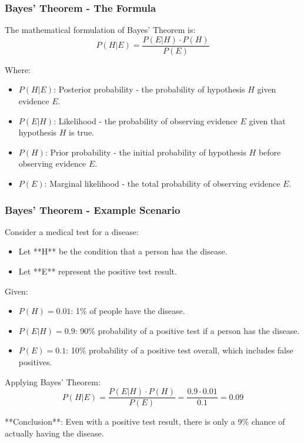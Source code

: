 \documentclass[aspectratio=169]{beamer}
\begin{document}
\begin{frame}[fragile]
    \frametitle{Bayes' Theorem - The Formula}
    The mathematical formulation of Bayes' Theorem is:
    \begin{equation}
    P(H|E) = \frac{P(E|H) \cdot P(H)}{P(E)}
    \end{equation}
    
    Where:
    \begin{itemize}
        \item $P(H|E)$: Posterior probability - the probability of hypothesis $H$ given evidence $E$.
        \item $P(E|H)$: Likelihood - the probability of observing evidence $E$ given that hypothesis $H$ is true.
        \item $P(H)$: Prior probability - the initial probability of hypothesis $H$ before observing evidence $E$.
        \item $P(E)$: Marginal likelihood - the total probability of observing evidence $E$.
    \end{itemize}
\end{frame}

\begin{frame}[fragile]
    \frametitle{Bayes' Theorem - Example Scenario}
    Consider a medical test for a disease:
    \begin{itemize}
        \item Let **H** be the condition that a person has the disease.
        \item Let **E** represent the positive test result.
    \end{itemize}
    
    Given:
    \begin{itemize}
        \item $P(H) = 0.01$: 1\% of people have the disease.
        \item $P(E|H) = 0.9$: 90\% probability of a positive test if a person has the disease.
        \item $P(E) = 0.1$: 10\% probability of a positive test overall, which includes false positives.
    \end{itemize}
    
    Applying Bayes' Theorem:
    \begin{equation}
    P(H|E) = \frac{P(E|H) \cdot P(H)}{P(E)} = \frac{0.9 \cdot 0.01}{0.1} = 0.09
    \end{equation}

    **Conclusion**: Even with a positive test result, there is only a 9\% chance of actually having the disease.
\end{frame}
\end{document}
